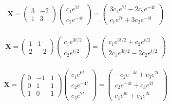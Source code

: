 \documentclass{article}
\begin{document}
\[\mathbf{X} = \begin{pmatrix}
    3 & -2 \\
    1 & 3
  \end{pmatrix} \begin{pmatrix}
    c_1 e^{7 t} \\
    c_2 e^{-4 t}
  \end{pmatrix} = \begin{pmatrix}
    3 c_1 e^{7 t} - 2 c_2 e^{-4 t} \\
    c_1 e^{7 t} + 3 c_2 e^{-4 t}
  \end{pmatrix}\]

\setcounter{subsubsection}{2}
\subsubsection{}

\[\mathbf{X} = \begin{pmatrix}
    1 & 1  \\
    2 & -2
  \end{pmatrix} \begin{pmatrix}
    c_1 e^{3 t / 2} \\
    c_2 e^{t / 2}
  \end{pmatrix} = \begin{pmatrix}
    c_1 e^{3 t / 2} + c_2 e^{t / 2} \\
    2 c_1 e^{3 t / 2} - 2 c_2 e^{t / 2}
  \end{pmatrix}\]

\setcounter{subsubsection}{4}
\subsubsection{}

\[\mathbf{X} = \begin{pmatrix}
    0 & -1 & 1 \\
    0 & 1  & 1 \\
    1 & 0  & 1
  \end{pmatrix} \begin{pmatrix}
    c_1 e^{6 t}  \\
    c_2 e^{-4 t} \\
    c_3 e^{2 t}
  \end{pmatrix} = \begin{pmatrix}
    -c_2 e^{-4 t} + c_3 e^{2 t} \\
    c_2 e^{-4 t} + c_3 e^{2 t}  \\
    c_1 e^{6 t} + c_3 e^{2 t}
  \end{pmatrix}\]
\end{document}
